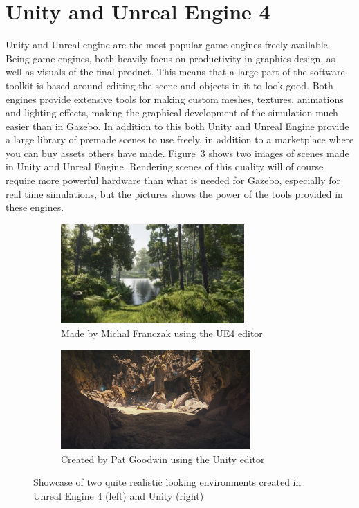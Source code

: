 \section{Unity and Unreal Engine 4} \label{sec: UnityUnreal}

Unity and Unreal engine are the most popular game engines freely available. Being game engines, both heavily focus on productivity in graphics design, as well as visuals of the final product. This means that a large part of the software toolkit is based around editing the scene and objects in it to look good. Both engines provide extensive tools for making custom meshes, textures, animations and lighting effects, making the graphical development of the simulation much easier than in Gazebo. In addition to this both Unity and Unreal Engine provide a large library of premade scenes to use freely, in addition to a marketplace where you can buy assets others have made. Figure~\ref{fig:showcase_unityunreal} shows two images of scenes made in Unity and Unreal Engine. Rendering scenes of this quality will of course require more powerful hardware than what is needed for Gazebo, especially for real time simulations, but the pictures shows the power of the tools provided in these engines. 

\begin{figure}[!htb]
    \centering
    \begin{subfigure}{0.45\textwidth}
        \includegraphics[height=3.8cm]{rapport/fig/Simulator/unrealforest.jpg}
        \caption{Made by Michal Franczak using the UE4 editor \cite{Unrealshowcase}}
        \label{fig:unreal_forest}
    \end{subfigure}
    \begin{subfigure}{0.45\textwidth}
        \includegraphics[height=3.8cm]{rapport/fig/Simulator/unitycave.jpg}
        \caption{Created by Pat Goodwin using the Unity editor \cite{Unityshowcase}}
        \label{fig:Unity_cave}
    \end{subfigure}
    \caption{Showcase of two quite realistic looking environments created in Unreal Engine 4 (left) and Unity (right)}
    \label{fig:showcase_unityunreal}
\end{figure}

